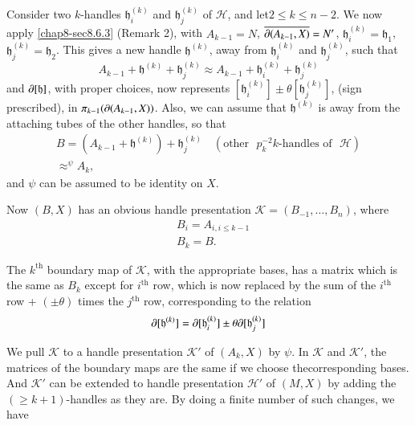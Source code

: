 Consider two $k$-handles $\mathfrak{h}^{(k)}_{i}$ and $\mathfrak{h}^{(k)}_{j}$ of $\mathscr{H}$, and let\pageoriginale $2\leq k\leq n-2$. We now apply \ref{chap8-sec8.6.3} (Remark 2), with $A_{k-1}=N$, $\overline{\partial (A_{k-1},X)}=N'$, $\mathfrak{h}^{(k)}_{i}=\mathfrak{h}_{1}$, $\mathfrak{h}^{(k)}_{j}=\mathfrak{h}_{2}$. This gives a new handle $\mathfrak{h}^{(k)}$, away from $\mathfrak{h}^{(k)}_{i}$ and $\mathfrak{h}^{(k)}_{j}$, such that
$$
A_{k-1}+\mathfrak{h}^{(k)}+\mathfrak{h}^{(k)}_{j}\approx A_{k-1}+\mathfrak{h}^{(k)}_{i}+\mathfrak{h}^{(k)}_{j}
$$
and $\partial[\mathfrak{h}]$, with proper choices, now represents $[\mathfrak{h}^{(k)}_{i}]\pm\theta[\mathfrak{h}^{(k)}_{j}]$, (sign prescribed), in $\pi_{k-1}(\partial (A_{k-1},X))$. Also, we can assume that $\mathfrak{h}^{(k)}$ is away from the attaching tubes of the other handles, so that 
\begin{gather*}
B=(A_{k-1}+\mathfrak{h}^{(k)})+\mathfrak{h}^{(k)}_{j}\quad(\text{other~ }p_{k}^{-2} k\text{-handles of~ } \mathscr{H})\\
{\displaystyle{\mathop{\approx}^{\psi}}}A_{k},
\end{gather*}
and $\psi$ can be assumed to be identity on $X$.

Now $(B,X)$ has an obvious handle presentation $\mathscr{K}=(B_{-1},\ldots,B_{n})$, where
\begin{align*}
& B_{i}=A_{i,i\leq k-1}\\
& B_{k}=B.
\end{align*}

The $k^{\text{th}}$ boundary map of $\mathscr{K}$, with the appropriate bases, has a matrix which is the same as $B_{k}$ except for $i^{\text{th}}$ row, which is now replaced by the sum of the $i^{\text{th}}$ row + $(\pm \theta)$ times the $j^{\text{th}}$ row, corresponding to the relation
$$
\partial[\mathfrak{h}^{(k)}]=\partial[\mathfrak{h}_{i}^{(k)}]\pm \theta \partial [\mathfrak{h}^{(k)}_{j}]
$$

We pull $\mathscr{K}$ to a handle presentation $\mathscr{K}'$ of $(A_{k},X)$ by $\psi$. In $\mathscr{K}$ and $\mathscr{K}'$, the matrices of the boundary maps are the same if we choose the\pageoriginale corresponding bases. And $\mathscr{K}'$ can be extended to handle presentation $\mathscr{H}'$ of $(M,X)$ by adding the $(\geq k+1)$-handles as they are. By doing a finite number of such changes, we have


